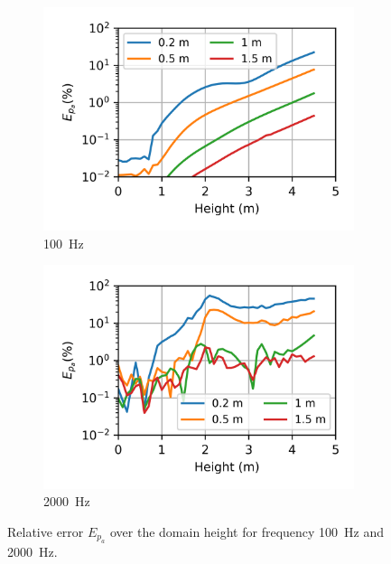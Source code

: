 \begin{figure}
	\centering
	\begin{subfigure}[b]{0.48\textwidth}
		\centering
		\includegraphics{fig/chap4/simulation_domain/error_100_Hz.png}
		\caption{\SI{100}{\hertz}}
		\label{fig:relative_error_over_height_100Hz}
	\end{subfigure}
	\hfill
	\begin{subfigure}[b]{0.48\textwidth}
		\centering
		\includegraphics{fig/chap4/simulation_domain/error_2000_Hz.png}
		\caption{\SI{2000}{\hertz}}
		\label{fig:relative_error_over_height_2000Hz}
	\end{subfigure}
	\caption{Relative error $E_{p_a}$ over the domain height for frequency \SI{100}{\hertz} and \SI{2000}{\hertz}.}
	\label{fig:relative_error_over_height}
\end{figure}

